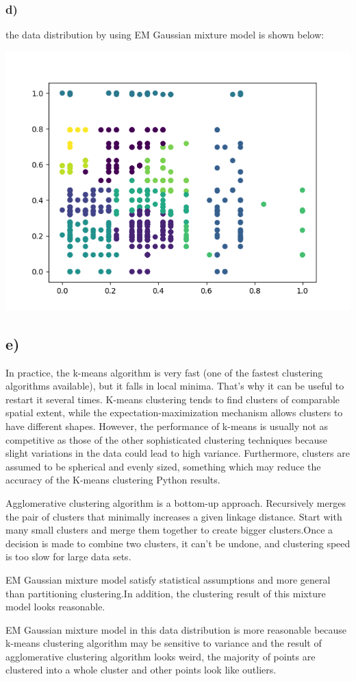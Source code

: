 \documentclass{article}
\begin{document}
\subsubsection{d)}

the data distribution by using EM Gaussian mixture model is shown below:

\includegraphics[scale=0.6]{EM_GaussianMixture_plot.png}

\subsection{e)}

In practice, the k-means algorithm is very fast (one of the fastest clustering algorithms available), but it falls in local minima. That’s why it can be useful to restart it several times. K-means clustering tends to find clusters of comparable spatial extent, while the expectation-maximization mechanism allows clusters to have different shapes. However, the performance of k-means is usually not as competitive as those of the other sophisticated clustering techniques because slight variations in the data could lead to high variance. Furthermore, clusters are assumed to be spherical and evenly sized, something which may reduce the accuracy of the K-means clustering Python results.

Agglomerative clustering algorithm is a bottom-up approach. Recursively merges the pair of clusters that minimally increases a given linkage distance. Start with many small clusters and merge them together to create bigger clusters.Once a decision is made to combine two clusters, it can’t be undone, and clustering speed is too slow for large data sets.

EM Gaussian mixture model satisfy statistical assumptions and more general than partitioning clustering.In addition, the clustering result of this mixture model looks reasonable.

EM Gaussian mixture model in this data distribution is more reasonable because k-means clustering algorithm may be sensitive to variance and the result of agglomerative clustering algorithm looks weird, the majority of points are clustered into a whole cluster and other points look like outliers.
\end{document}
